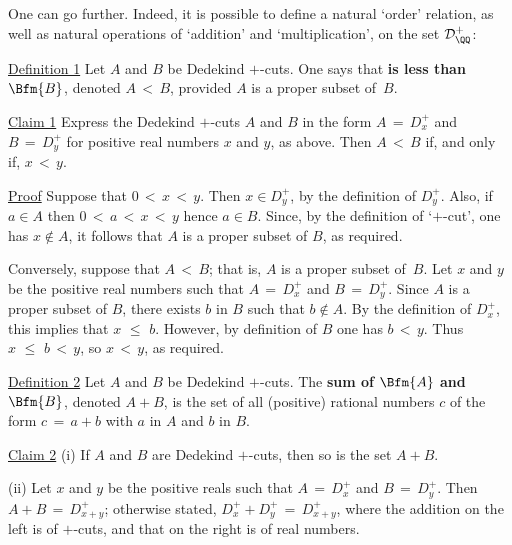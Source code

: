 {\V

        One can go further. Indeed, it is possible to define a natural `order' relation,
    as well as natural operations of `addition' and `multiplication', on the set ${\cal D}_{{\QQ}}^{+}$:

\V

        \underline{Definition 1} Let $A$ and $B$ be Dedekind $+$-cuts. One says that {\bf {} is less than $\Bfm{B}$}, denoted $A\,<\,B$, provided $A$ is a proper subset of~$B$.

\VA

        \underline{Claim 1} Express the Dedekind $+$-cuts $A$ and $B$ in the form $A \,=\, D_{x}^{+}$ and $B \,=\, D_{y}^{+}$ for positive real numbers $x$ and $y$, as above.
    Then $A\,<\,B$ if, and only if, $x\,<\,y$.

        \underline{Proof} Suppose that $0\,<\,x\,<\,y$. Then $x{\in}D_{y}^{+}$, by the definition of $D_{y}^{+}$.
    Also, if $a{\in}A$ then $0\,<\,a\,<\,x\,<\,y$ hence $a{\in}B$. Since, by the definition of  `$+$-cut',
    one has $x \not \in A$, it follows that $A$ is a proper subset of $B$, as required.

        Conversely, suppose that $A\,<\,B$; that is, $A$ is a proper subset of~$B$.
    Let $x$ and $y$ be the positive real numbers such that $A \,=\, D_{x}^{+}$ and $B \,=\, D_{y}^{+}$.
    Since $A$ is a proper subset of $B$, there exists $b$ in $B$ such that $b \not \in A$.
    By the definition of $D_{x}^{+}$, this implies that $x\,\,{\leq}\,\,b$. However, by definition of $B$ one has $b\,<\,y$.
    Thus $x\,\,{\leq}\,\,b\,<\,y$, so $x\,<\,y$, as required.

\V

        \underline{Definition 2} Let $A$ and $B$ be Dedekind $+$-cuts. The {\bf sum of $\Bfm{A}$ and $\Bfm{B}$}, denoted $A+B$,
    is the set of all (positive) rational numbers $c$ of the form $c \,=\, a+b$ with $a$ in $A$ and $b$ in $B$.

        \underline{Claim 2} (i) If $A$ and $B$ are Dedekind $+$-cuts, then so is the set $A+B$.

        (ii) Let $x$ and $y$ be the positive reals such that $A \,=\, D_{x}^{+}$ and $B \,=\, D_{y}^{+}$. Then $A+B \,=\, D_{x+y}^{+}$;
    otherwise stated, $D_{x}^{+} + D_{y}^{+} \,=\, D_{x+y}^{+}$, where the addition on the left is of $+$-cuts, and that on the right is of real numbers.

\VA

}
